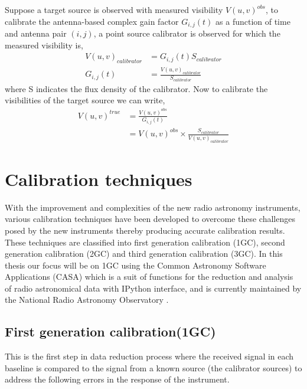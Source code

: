 Suppose a target source is observed with measured visibility $V(u,v)^{obs}$, to calibrate the antenna-based complex gain factor $G_{i,j}(t)$ as a function of time and antenna pair $(i,j)$, a point source calibrator is observed for which the measured visibility is, 
\begin{align}
V(u,v)_{calibrator}&= G_{i,j}(t) S_{calibrator}\\
G_{i,j}(t)&= \frac{V(u,v)_{calibrator}}{S_{calibrator}}
\end{align}
\citep{thompson2001interferometry}
where S indicates the flux density of the calibrator. Now to calibrate the visibilities of the target source we can write, 
\begin{align}
V(u,v)^{true}&= \frac{V(u,v)^{obs}}{G_{i,j}(t)}\\
&= V(u,v)^{obs} \times \frac{S_{calibrator}}{V(u,v)_{calibrator}} 
\end{align}
\citep{thompson2001interferometry} 

\section{Calibration techniques}
\label{caltech}
With the improvement and complexities of the new radio astronomy instruments, various calibration techniques have been developed to overcome these challenges  posed by the new instruments thereby producing accurate calibration results. These techniques are classified into first generation calibration (1GC), second generation calibration (2GC) and third generation calibration (3GC). In this thesis our focus will be on 1GC using the Common Astronomy Software Applications (CASA) which is a suit of functions for the reduction and analysis of radio astronomical data with IPython interface, and is currently maintained by the National Radio Astronomy Observatory \citep{mcmullin2007casa}. 

\subsection{First generation calibration(1GC)}

This is the first step in data reduction process where the received signal in each baseline is compared to the signal from a known source (the calibrator sources) to address the following errors in the response of the instrument. 

